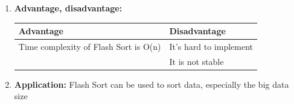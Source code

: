 \documentclass[11pt,a4paper]{article}
\begin{document}
{\begin{enumerate}[label=\textbf{\arabic*})]
				\item \textbf{Advantage, disadvantage:}
					\begin{table}[H]
						\centering
						\begin{tabular}{|p{8cm}|p{8cm}|}
							\hline
							\textbf{Advantage} & \textbf{Disadvantage} \\
							\hline
							\hline
							Time complexity of Flash Sort is O(n)  & It’s hard to implement \\[12pt]
							 & It is not stable\\
							\hline
						\end{tabular}
					\end{table}
				\item \textbf{Application:}	
					Flash Sort can be used to sort data, especially the big data size
			\end{enumerate}
	
	\pagebreak
}
\end{document}
